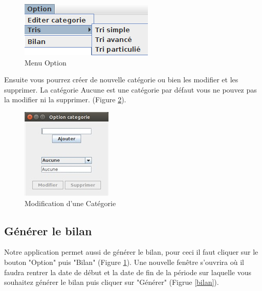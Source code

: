 \documentclass{article}
\begin{document}
\begin{figure}[h]
	\centering
	\includegraphics[scale=0.6]{images/MenuOption.png}
	\caption{Menu Option}
	\label{barre Opiton}
\end{figure}

Ensuite vous pourrez créer de nouvelle catégorie ou bien les modifier et les supprimer. La catégorie Aucune est une catégorie par défaut vous ne pouvez pas la modifier ni la supprimer. (Figure \ref{modif Opiton}).

\begin{figure}[h]
	\centering
	\includegraphics[scale=0.8]{images/Capture_edit_categorie.jpg}
	\caption{Modification d'une Catégorie}
	\label{modif Opiton}
\end{figure}

\subsection{Générer le bilan}

Notre application permet aussi de générer le bilan, pour ceci il faut cliquer sur le bouton "Option" puis "Bilan" (Figure \ref{barre Opiton}).
Une nouvelle fenêtre s'ouvrira où il faudra rentrer la date de début et la date de fin de la période sur laquelle vous souhaitez générer le bilan puis cliquer sur "Générer" (Figrue \ref{bilan}).
\end{document}
